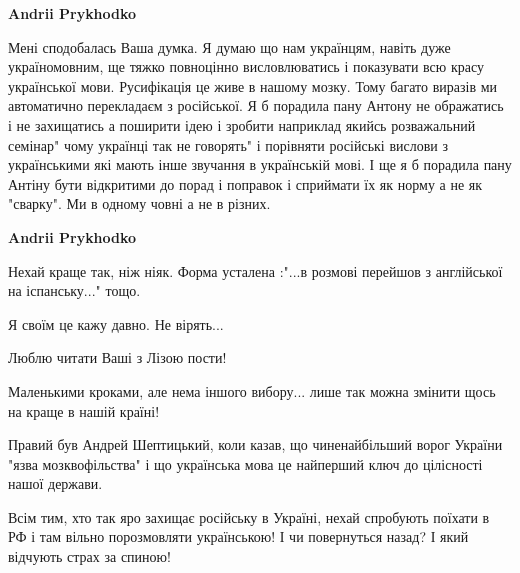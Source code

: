 \begin{itemize}
\begin{itemize}
\textbf{Andrii Prykhodko} 

Мені сподобалась Ваша думка. Я думаю що нам українцям, навіть дуже
україномовним, ще тяжко повноцінно висловлюватись і показувати всю красу
української мови. Русифікація це живе в нашому мозку. Тому багато виразів ми
автоматично перекладаєм з російської. Я б порадила пану Антону не ображатись і
не захищатись а поширити ідею і зробити наприклад якийсь розважальний семінар"
чому українці так не говорять" і порівняти російські вислови з українськими які
мають інше звучання в українській мові. І ще я б порадила пану Антіну бути
відкритими до порад і поправок і сприймати їх як норму а не як "сварку". Ми в
одному човні а не в різних.


 
\textbf{Andrii Prykhodko} 

Нехай краще так, ніж ніяк. Форма усталена :"...в розмові перейшов з англійської на іспанську..." тощо.

\end{itemize}

 
Я своїм це кажу давно. Не вірять...

 
Люблю читати Ваші з Лізою пости!

Маленькими кроками, але нема іншого вибору... лише так можна змінити щось на
краще в нашій країні!

Правий був Андрей Шептицький, коли казав, що чиненайбільший ворог України "язва
мозквофільства" і що українська мова це найперший ключ до цілісності нашої
держави.

Всім тим, хто так яро захищає російську в Україні, нехай спробують поїхати в РФ
і там вільно порозмовляти українською! І чи повернуться назад? І який відчують
страх за спиною!



\end{itemize}
